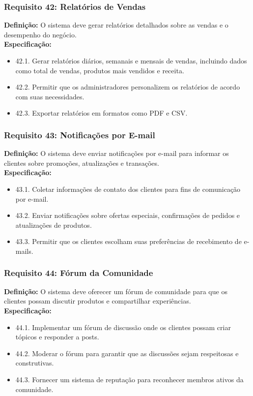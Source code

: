 \subsubsection{Requisito 42: Relatórios de Vendas}
\textbf{Definição:} O sistema deve gerar relatórios detalhados sobre as vendas e o desempenho do negócio.
\\
\textbf{Especificação:}
\begin{itemize}
	\item 42.1. Gerar relatórios diários, semanais e mensais de vendas, incluindo dados como total de vendas, produtos mais vendidos e receita.
	\item 42.2. Permitir que os administradores personalizem os relatórios de acordo com suas necessidades.
	\item 42.3. Exportar relatórios em formatos como PDF e CSV.
\end{itemize}

\subsubsection{Requisito 43: Notificações por E-mail}
\textbf{Definição:} O sistema deve enviar notificações por e-mail para informar os clientes sobre promoções, atualizações e transações.
\\
\textbf{Especificação:}
\begin{itemize}
	\item 43.1. Coletar informações de contato dos clientes para fins de comunicação por e-mail.
	\item 43.2. Enviar notificações sobre ofertas especiais, confirmações de pedidos e atualizações de produtos.
	\item 43.3. Permitir que os clientes escolham suas preferências de recebimento de e-mails.
\end{itemize}

\subsubsection{Requisito 44: Fórum da Comunidade}
\textbf{Definição:} O sistema deve oferecer um fórum de comunidade para que os clientes possam discutir produtos e compartilhar experiências.
\\
\textbf{Especificação:}
\begin{itemize}
	\item 44.1. Implementar um fórum de discussão onde os clientes possam criar tópicos e responder a posts.
	\item 44.2. Moderar o fórum para garantir que as discussões sejam respeitosas e construtivas.
	\item 44.3. Fornecer um sistema de reputação para reconhecer membros ativos da comunidade.
\end{itemize}

